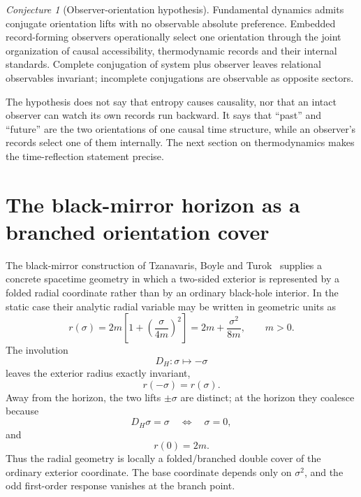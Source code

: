 \documentclass[11pt]{article}
\theoremstyle{definition}\newtheorem{definition}[theorem]{Definition}
\theoremstyle{remark}\newtheorem{remark}[theorem]{Remark}\newtheorem{conjecture}[theorem]{Conjecture}
\begin{document}
\begin{conjecture}[Observer-orientation hypothesis]\label{conj:observer}
Fundamental dynamics admits conjugate orientation lifts with no observable absolute preference. Embedded record-forming observers operationally select one orientation through the joint organization of causal accessibility, thermodynamic records and their internal standards. Complete conjugation of system plus observer leaves relational observables invariant; incomplete conjugations are observable as opposite sectors.
\end{conjecture}

The hypothesis does not say that entropy causes causality, nor that an intact observer can watch its own records run backward. It says that ``past'' and ``future'' are the two orientations of one causal time structure, while an observer's records select one of them internally. The next section on thermodynamics makes the time-reflection statement precise.

\section{The black-mirror horizon as a branched orientation cover}\label{sec:blackmirror}
The black-mirror construction of Tzanavaris, Boyle and Turok~\cite{TzanavarisBoyleTurok2025} supplies a concrete spacetime geometry in which a two-sided exterior is represented by a folded radial coordinate rather than by an ordinary black-hole interior. In the static case their analytic radial variable may be written in geometric units as
\begin{equation}\label{eq:mirrorradius}
 r(\sigma)=2m\left[1+\left(\frac{\sigma}{4m}\right)^2\right]
 =2m+\frac{\sigma^2}{8m},\qquad m>0.
\end{equation}
The involution
\begin{equation}
 D_H:\sigma\mapsto-\sigma
\end{equation}
leaves the exterior radius exactly invariant,
\begin{equation}\label{eq:mirrorsheet}
 \boxed{r(-\sigma)=r(\sigma)}.
\end{equation}
Away from the horizon, the two lifts $\pm\sigma$ are distinct; at the horizon they coalesce because
\begin{equation}
 D_H\sigma=\sigma\quad\Longleftrightarrow\quad\sigma=0,
\end{equation}
and
\begin{equation}
 r(0)=2m.
\end{equation}
Thus the radial geometry is locally a folded/branched double cover of the ordinary exterior coordinate. The base coordinate depends only on $\sigma^2$, and the odd first-order response vanishes at the branch point.
\end{document}
